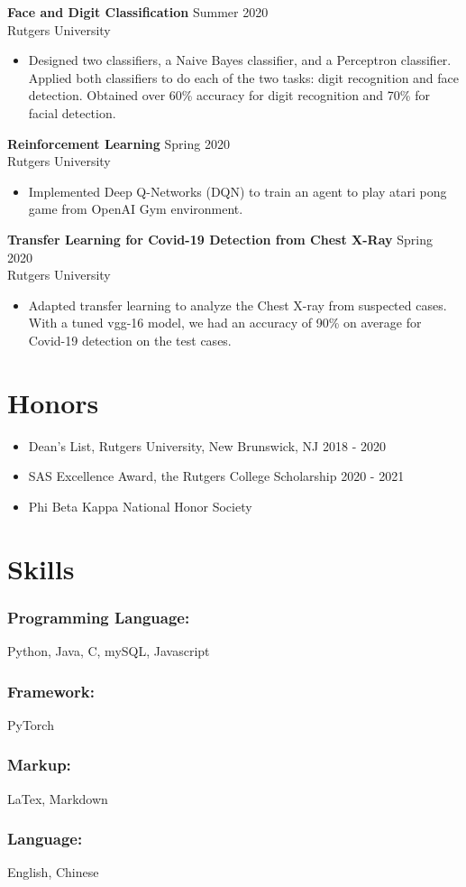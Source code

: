 \documentclass{article}
\begin{document}
\noindent \textbf{Face and Digit Classification}
\hfill{Summer 2020}\\
Rutgers University
\begin{itemize}
  \itemsep0em
  \item Designed two classifiers, a Naive Bayes classifier, and a Perceptron classifier. Applied both classifiers to do each of the two tasks: digit recognition and face detection. Obtained over 60\% accuracy for digit recognition and 70\% for facial detection.
\end{itemize}

\noindent \textbf{Reinforcement Learning}
\hfill{Spring 2020}\\
Rutgers University
\begin{itemize}
  \itemsep0em
  \item Implemented Deep Q-Networks (DQN) to train an agent to play atari pong game from OpenAI Gym environment.
\end{itemize}

\noindent \textbf{Transfer Learning for Covid-19 Detection from Chest X-Ray}
\hfill{Spring 2020}\\
Rutgers University
\begin{itemize}
  \itemsep0em
  \item  Adapted transfer learning to analyze the Chest X-ray from suspected cases.  With a tuned vgg-16 model, we had an accuracy of 90\% on average for Covid-19 detection on the test cases.
\end{itemize}

\section{Honors}
\begin{itemize}
	\item Dean's List, Rutgers University, New Brunswick, NJ \hfill{2018 - 2020}
	\item SAS Excellence Award, the Rutgers College Scholarship \hfill{2020 - 2021}
	\item Phi Beta Kappa National Honor Society
\end{itemize}

\section{Skills}

\subsubsection{Programming Language:}

Python, Java, C, mySQL,  Javascript

\subsubsection{Framework:}

PyTorch

\subsubsection{Markup:}

LaTex, Markdown

\subsubsection{Language:}
English, Chinese
\end{document}
